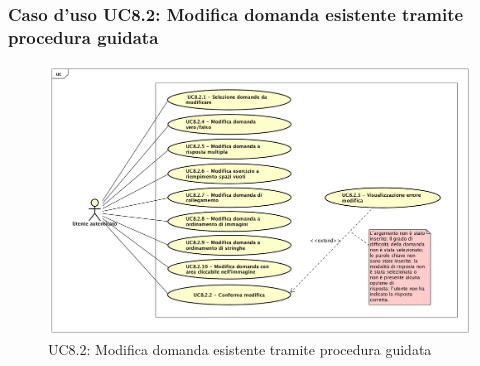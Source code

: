 	\subsubsection{Caso d'uso UC8.2: Modifica domanda esistente tramite procedura guidata}
	\label{UC8.2}
	\begin{figure}[h]
		\centering
			\includegraphics[scale=0.41,keepaspectratio]{UML/UC8_2.png}
		\caption{UC8.2: Modifica domanda esistente tramite procedura guidata}
	\end{figure}
	\FloatBarrier
